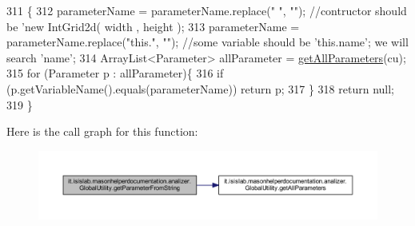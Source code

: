 \begin{DoxyCode}
311                                                                                             \{
312         parameterName = parameterName.replace(\textcolor{stringliteral}{" "}, \textcolor{stringliteral}{""}); \textcolor{comment}{//contructor should be 'new IntGrid2d( width  ,
       height  );}
313         parameterName = parameterName.replace(\textcolor{stringliteral}{"this."}, \textcolor{stringliteral}{""}); \textcolor{comment}{//some variable should be 'this.name'; we will
       search 'name';}
314         ArrayList<Parameter> allParameter = \hyperlink{classit_1_1isislab_1_1masonhelperdocumentation_1_1analizer_1_1_global_utility_a7bfa58de5b5e760b043e34e98aa222ee}{getAllParameters}(cu);
315         \textcolor{keywordflow}{for} (Parameter p : allParameter)\{
316             \textcolor{keywordflow}{if} (p.getVariableName().equals(parameterName))  \textcolor{keywordflow}{return} p;
317         \}       
318         \textcolor{keywordflow}{return} null;
319     \}
\end{DoxyCode}


Here is the call graph for this function\-:\nopagebreak
\begin{figure}[H]
\begin{center}
\leavevmode
\includegraphics[width=350pt]{classit_1_1isislab_1_1masonhelperdocumentation_1_1analizer_1_1_global_utility_ad7c0b1c480e30f055bb39d24c68902e7_cgraph}
\end{center}
\end{figure}


